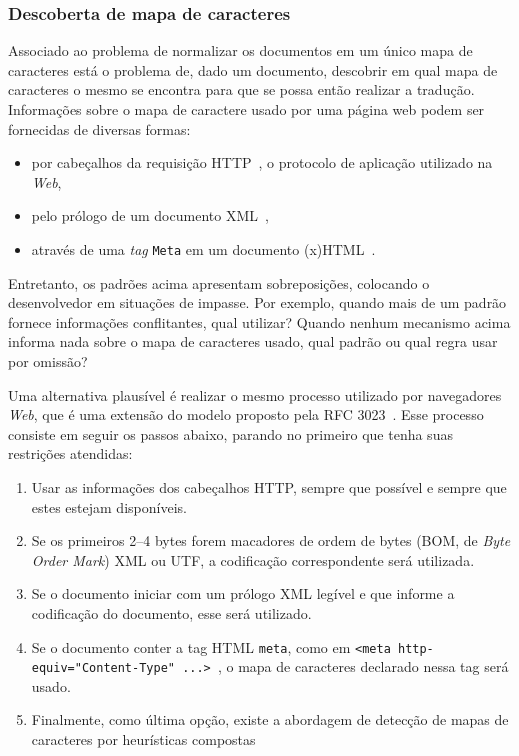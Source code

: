 \documentclass[10pt,twocolumn]{article}
\begin{document}
\subsubsection{Descoberta de mapa de
caracteres}\label{prob:charmapdetection}

Associado ao problema de normalizar os documentos em um único mapa de
caracteres está o problema de, dado um documento, descobrir em qual mapa
de caracteres o mesmo se encontra para que se possa então realizar a
tradução. Informações sobre o mapa de caractere usado por uma página web
podem ser fornecidas de diversas formas:
\begin{itemize}
\item por cabeçalhos da requisição HTTP~\cite{rfc2616},
 o protocolo de aplicação utilizado na \emph{Web},
\item pelo prólogo de um documento XML~\cite{bray2006xml},
\item através de uma \emph{tag} \texttt{Meta} em um documento
(x)HTML~\cite{html4tr}.
\end{itemize}

Entretanto, os padrões acima apresentam sobreposições, colocando o
desenvolvedor em situações de impasse. Por exemplo, quando mais de um
padrão fornece informações conflitantes, qual utilizar?  Quando nenhum
mecanismo acima informa nada sobre o mapa de caracteres usado, qual
padrão ou qual regra usar por omissão?

%

Uma alternativa plausível é realizar o mesmo processo utilizado por
navegadores \emph{Web}, que é uma extensão do modelo proposto pela RFC
3023~\cite{rfc3023}. Esse processo consiste em seguir os passos abaixo,
parando no primeiro que tenha suas restrições atendidas:
\begin{enumerate}
\item Usar as informações dos cabeçalhos HTTP, sempre que possível e
sempre que estes estejam disponíveis.
\item  Se os primeiros 2--4 bytes forem macadores de ordem de bytes
(BOM, de \emph{Byte Order Mark}) XML ou UTF, a codificação
correspondente será utilizada.
\item Se o documento iniciar com um prólogo XML legível e que informe a
codificação do documento, esse será utilizado.
\item Se o documento conter a tag HTML \texttt{meta}, como em \texttt{<meta
http-equiv="Content-Type" ...> }, o mapa de caracteres declarado nessa
tag será usado.
\item Finalmente, como última opção, existe a abordagem de detecção de
mapas de caracteres por heurísticas compostas~\cite{mozillaiuc}
\end{enumerate}
\end{document}
